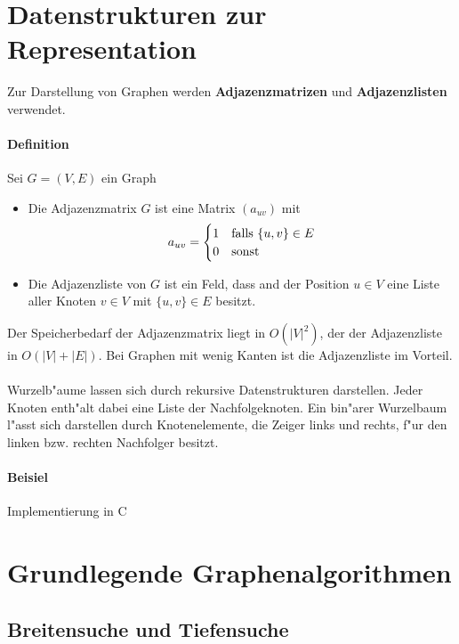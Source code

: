 \section{Datenstrukturen zur Representation}

Zur Darstellung von Graphen werden \textbf{Adjazenzmatrizen} und \textbf{Adjazenzlisten} verwendet.

\paragraph{Definition} Sei $G=(V,E)$ ein Graph
\begin{itemize}
    \item Die Adjazenzmatrix $G$ ist eine Matrix $(a_{uv})$ mit
          \[
            a_{uv}=\begin{cases}
                1 & \text{falls } \{u,v\}\in E\\
                0 & \text{sonst}
            \end{cases}
          \]
    \item Die Adjazenzliste von $G$ ist ein Feld, dass and der Position $u\in V$ eine Liste aller Knoten
          $v\in V$ mit $\{u,v\}\in E$ besitzt.
\end{itemize}

Der Speicherbedarf der Adjazenzmatrix liegt in $O(|V|^2)$, der der Adjazenzliste in $O(|V|+|E|)$. Bei
Graphen mit wenig Kanten ist die Adjazenzliste im Vorteil.\\
\\ %
Wurzelb"aume lassen sich durch rekursive Datenstrukturen darstellen. Jeder Knoten enth"alt dabei eine Liste
der Nachfolgeknoten. Ein bin"arer Wurzelbaum l"asst sich darstellen durch Knotenelemente, die Zeiger links
und rechts, f"ur den linken bzw. rechten Nachfolger besitzt.

\paragraph{Beisiel} Implementierung in C

\section{Grundlegende Graphenalgorithmen}
\subsection{Breitensuche und Tiefensuche}

